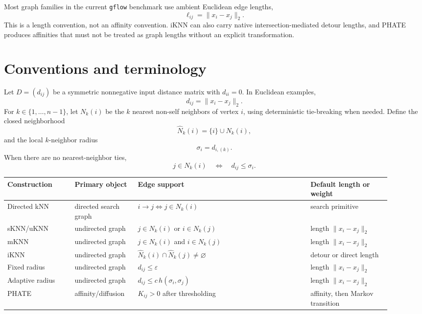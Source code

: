 \documentclass[11pt]{article}
\newcommand{\eps}{\varepsilon}
\begin{document}
Most graph families in the current \texttt{gflow} benchmark use ambient Euclidean edge
lengths,
\[
  \ell_{ij}=\|x_i-x_j\|_2.
\]
This is a length convention, not an affinity convention.  iKNN can also carry native
intersection-mediated detour lengths, and PHATE produces affinities that must not be
treated as graph lengths without an explicit transformation.

\section{Conventions and terminology}

Let \(D=(d_{ij})\) be a symmetric nonnegative input distance matrix with \(d_{ii}=0\).  In
Euclidean examples,
\[
  d_{ij}=\|x_i-x_j\|_2.
\]
For \(k\in\{1,\ldots,n-1\}\), let \(N_k(i)\) be the \(k\) nearest non-self neighbors of
vertex \(i\), using deterministic tie-breaking when needed.  Define the closed
neighborhood
\[
  \widehat{N}_k(i)=\{i\}\cup N_k(i),
\]
and the local \(k\)-neighbor radius
\[
  \sigma_i=d_{i,(k)}.
\]
When there are no nearest-neighbor ties,
\[
  j\in N_k(i)
  \quad\Longleftrightarrow\quad
  d_{ij}\le \sigma_i.
\]

\begin{center}
\scriptsize
\begin{tabular}{@{}p{0.16\linewidth}p{0.15\linewidth}p{0.41\linewidth}p{0.19\linewidth}@{}}
\toprule
Construction & Primary object & Edge support & Default length or weight \\
\midrule
Directed kNN & directed search graph & \(i\to j \Longleftrightarrow j\in N_k(i)\) & search primitive \\
sKNN/uKNN & undirected graph & \(j\in N_k(i)\) or \(i\in N_k(j)\) & length \(\|x_i-x_j\|_2\) \\
mKNN & undirected graph & \(j\in N_k(i)\) and \(i\in N_k(j)\) & length \(\|x_i-x_j\|_2\) \\
iKNN & undirected graph & \(\widehat{N}_k(i)\cap\widehat{N}_k(j)\ne\varnothing\) & detour or direct length \\
Fixed radius & undirected graph & \(d_{ij}\le \eps\) & length \(\|x_i-x_j\|_2\) \\
Adaptive radius & undirected graph & \(d_{ij}\le c\,h(\sigma_i,\sigma_j)\) & length \(\|x_i-x_j\|_2\) \\
PHATE & affinity/diffusion & \(K_{ij}>0\) after thresholding & affinity, then Markov transition \\
\bottomrule
\end{tabular}
\end{center}
\end{document}
